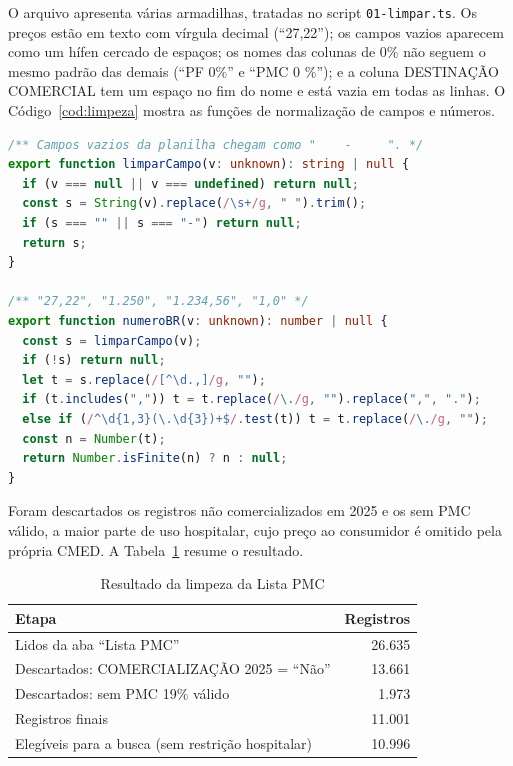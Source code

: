 \documentclass[12pt,oneside,a4paper,english,brazil]{abntex2}
\newcommand{\campo}[1]{\texttt{#1}}
\begin{document}
O arquivo apresenta várias armadilhas, tratadas no script \campo{01-limpar.ts}. Os preços estão em texto com vírgula decimal (``27,22''); os campos vazios aparecem como um hífen cercado de espaços; os nomes das colunas de 0\% não seguem o mesmo padrão das demais (``PF 0\%'' e ``PMC 0 \%''); e a coluna DESTINAÇÃO COMERCIAL tem um espaço no fim do nome e está vazia em todas as linhas. O Código~\ref{cod:limpeza} mostra as funções de normalização de campos e números.

\begin{lstlisting}[language=TypeScript, caption={Normalização de campos vazios e números no padrão brasileiro}, label=cod:limpeza]
/** Campos vazios da planilha chegam como "    -     ". */
export function limparCampo(v: unknown): string | null {
  if (v === null || v === undefined) return null;
  const s = String(v).replace(/\s+/g, " ").trim();
  if (s === "" || s === "-") return null;
  return s;
}

/** "27,22", "1.250", "1.234,56", "1,0" */
export function numeroBR(v: unknown): number | null {
  const s = limparCampo(v);
  if (!s) return null;
  let t = s.replace(/[^\d.,]/g, "");
  if (t.includes(",")) t = t.replace(/\./g, "").replace(",", ".");
  else if (/^\d{1,3}(\.\d{3})+$/.test(t)) t = t.replace(/\./g, "");
  const n = Number(t);
  return Number.isFinite(n) ? n : null;
}
\end{lstlisting}

Foram descartados os registros não comercializados em 2025 e os sem PMC válido, a maior parte de uso hospitalar, cujo preço ao consumidor é omitido pela própria CMED. A Tabela~\ref{tab:limpeza} resume o resultado.

\begin{table}[htb]
  \centering
  \caption{Resultado da limpeza da Lista PMC}
  \label{tab:limpeza}
  \begin{tabular}{|l|r|}
    \hline
    \textbf{Etapa} & \textbf{Registros} \\ \hline
    Lidos da aba ``Lista PMC'' & 26.635 \\ \hline
    Descartados: COMERCIALIZAÇÃO 2025 = ``Não'' & 13.661 \\ \hline
    Descartados: sem PMC 19\% válido & 1.973 \\ \hline
    Registros finais & 11.001 \\ \hline
    Elegíveis para a busca (sem restrição hospitalar) & 10.996 \\ \hline
  \end{tabular}
\end{table}
\end{document}
